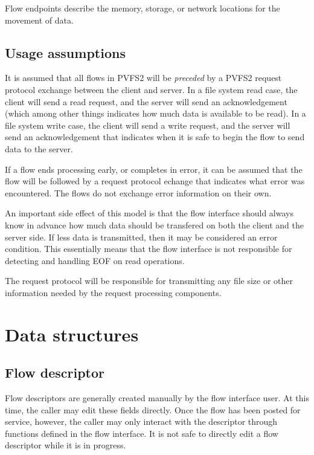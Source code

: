 \documentclass[12pt]{article} %
\begin{document}
Flow endpoints describe the memory, storage, or network locations for
the movement of data.  

\subsection{Usage assumptions}

It is assumed that all flows in PVFS2 will be \emph{preceded} by a
PVFS2 request protocol exchange between the client and server.  In
a file system read case, the client will send a read request, and
the server will send an acknowledgement (which among other things
indicates how much data is available to be read).  In a file
system write case, the client will send a write request, and the
server will send an acknowledgement that indicates when it is safe
to begin the flow to send data to the server.

If a flow ends processing early, or completes in error, it can be
assumed that the flow will be followed by a request protocol
echange that indicates what error was encountered.  The flows do
not exchange error information on their own.

An important side effect of this model is that the flow interface
should always know in advance how much data should be transfered
on both the client and the server side.  If less data is
transmitted, then it may be considered an error condition.  This
essentially means that the flow interface is not responsible for
detecting and handling EOF on read operations.

The request protocol will be responsible for transmitting any file
size or other information needed by the request processing
components.

\section{Data structures}

\subsection{Flow descriptor}
\label{sec:flow-desc}

Flow descriptors are generally created manually by the flow interface
user.  At this time, the caller may edit these fields directly.  Once the
flow has been posted for service, however, the caller may only interact
with the descriptor through functions defined in the flow interface.
It is not safe to directly edit a flow descriptor while it is in progress.
\end{document}
